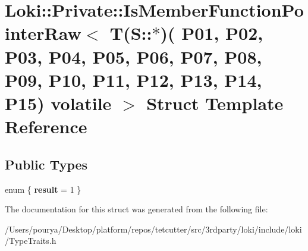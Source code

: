 \hypertarget{structLoki_1_1Private_1_1IsMemberFunctionPointerRaw_3_01T_07S_1_1_5_08_07_01_01_01_01_01_01_01_0c1c544c68c9aa7d901c49b8fa4c91684}{}\section{Loki\+:\+:Private\+:\+:Is\+Member\+Function\+Pointer\+Raw$<$ T(S\+:\+:$\ast$)( P01, P02, P03, P04, P05, P06, P07, P08, P09, P10, P11, P12, P13, P14, P15) volatile $>$ Struct Template Reference}
\label{structLoki_1_1Private_1_1IsMemberFunctionPointerRaw_3_01T_07S_1_1_5_08_07_01_01_01_01_01_01_01_0c1c544c68c9aa7d901c49b8fa4c91684}
\subsection*{Public Types}
\begin{DoxyCompactItemize}
\item 
\hypertarget{structLoki_1_1Private_1_1IsMemberFunctionPointerRaw_3_01T_07S_1_1_5_08_07_01_01_01_01_01_01_01_0c1c544c68c9aa7d901c49b8fa4c91684_a6ea70e60425967b5dad8818b103fbea4}{}enum \{ {\bfseries result} = 1
 \}\label{structLoki_1_1Private_1_1IsMemberFunctionPointerRaw_3_01T_07S_1_1_5_08_07_01_01_01_01_01_01_01_0c1c544c68c9aa7d901c49b8fa4c91684_a6ea70e60425967b5dad8818b103fbea4}

\end{DoxyCompactItemize}


The documentation for this struct was generated from the following file\+:\begin{DoxyCompactItemize}
\item 
/\+Users/pourya/\+Desktop/platform/repos/tetcutter/src/3rdparty/loki/include/loki/Type\+Traits.\+h\end{DoxyCompactItemize}
